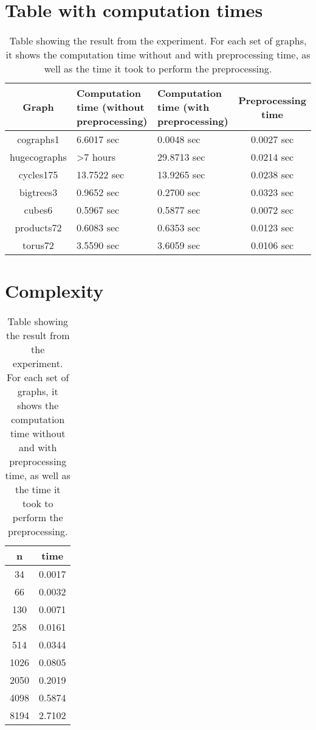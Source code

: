 \documentclass[twoside]{article}
\theoremstyle{definition}
\theoremstyle{plain}
\begin{document}
\begin{appendices}
\section{Table with computation times}
\begin{table}[h]
\begin{tabular}{c|C{0.3\textwidth}|C{0.3\textwidth}|c}
Graph & Computation time (without preprocessing) & Computation time (with preprocessing) & Preprocessing time \\
\hline
cographs1 & 6.6017 sec & 0.0048 sec & 0.0027 sec \\
hugecographs & >7 hours & 29.8713 sec & 0.0214 sec \\
cycles175 & 13.7522 sec & 13.9265 sec & 0.0238 sec\\
bigtrees3 & 0.9652 sec & 0.2700 sec & 0.0323 sec\\
cubes6 & 0.5967 sec & 0.5877 sec & 0.0072 sec\\
products72 & 0.6083 sec & 0.6353 sec & 0.0123 sec\\
torus72 & 3.5590 sec & 3.6059 sec & 0.0106 sec\\
\end{tabular}
\caption{Table showing the result from the experiment. For each set of graphs, it shows the computation time without and with preprocessing time, as well as the time it took to perform the preprocessing.}
\label{table:results}
\end{table}

\section{Complexity}
\begin{table}[h]
\begin{tabular}{c|c}
n & time \\
\hline
34 & 0.0017\\
66 & 0.0032\\
130 & 0.0071\\
258 & 0.0161\\
514 & 0.0344\\
1026 & 0.0805\\
2050 & 0.2019\\
4098 & 0.5874\\
8194 & 2.7102

\end{tabular}
\caption{Table showing the result from the experiment. For each set of graphs, it shows the computation time without and with preprocessing time, as well as the time it took to perform the preprocessing.}
\label{table:results}
\end{table}
\end{appendices}
\end{document}
